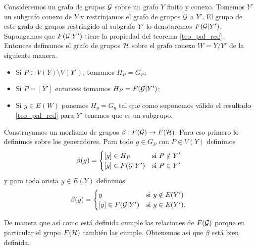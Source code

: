 \documentclass[tesis.tex]{subfiles}
\begin{document}
Consideremos un grafo de grupos ${\cal G}$ sobre un grafo $Y$ finito y conexo. 
Tomemos $Y'$ un subgrafo conexo de $Y$ y restrinjamos el grafo de grupos ${\cal G}$ a $Y'$. 
El grupo de este grafo de grupos restringido al subgrafo $Y'$ lo denotaremos $F({\cal G} | Y')$.
Supongamos que $F({\cal G} | Y')$ tiene la propiedad del teorema \ref{teo_pal_red}.
Entonces definamos el grafo de grupos $\cal H$ sobre el grafo conexo $W=Y/Y'$ de la siguiente manera.
\begin{itemize}
	\item Si $P \in V(Y) \setminus V(Y')$, tomamos $H_P = G_P$;
	\item Si $P = [Y']$ entonces tomamos $H_P = F({\cal G} | Y')$;
	\item Si $y \in E(W)$ ponemos $H_y = G_y$ tal que como suponemos válido el resultado \ref{teo_pal_red} para $Y'$ tenemos que es un subgrupo.
\end{itemize}

Construyamos un morfismo de grupos $\beta:F({\cal G}) \to F({\cal H})$.
Para eso primero lo definimos sobre los generadores.
Para todo $g \in G_P$ con $P \in V(Y)$ definimos
\begin{equation*}
	\beta(g) = 
	\begin{cases}
		[g] \in H_P & \text{si} \ P \notin Y' \\
		[g] \in F({\cal G} | Y') & \text{si} \ P \in Y'  \\ 
	\end{cases}
\end{equation*}
y para toda arista $ y \in E(Y)$ definimos
\begin{equation*}
	\beta(y) = 
	\begin{cases}
		y  & \text{si} \ y \notin E(Y') \\
		[y] \in F({\cal G} | Y') & \text{si} \ y \in E(Y').  \\ 
	\end{cases}
\end{equation*}

De manera que así como está definida cumple las relaciones de $F({\cal G})$ porque en particular el grupo $F({\cal H})$ también las cumple.
Obtenemos así que $\beta$ está bien definida.
\end{document}
